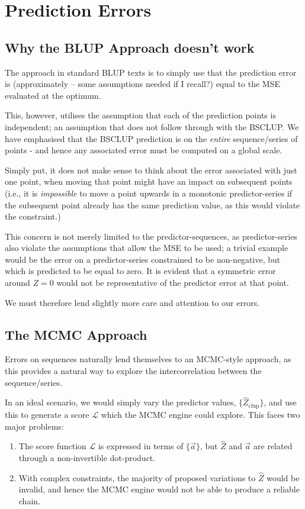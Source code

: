\documentclass[]{article}
\begin{document}
	\section{Prediction Errors}
		
		\subsection{Why the BLUP Approach doesn't work}
			
			The approach in standard BLUP texts is to simply use that the prediction error is (approximately -- some assumptions needed if I recall?) equal to the MSE evaluated at the optimum.

			This, however, utilises the assumption that each of the prediction points is independent; an assumption that does not follow through with the BSCLUP. We have emphasised that the BSCLUP prediction is on the \textit{entire} sequence/series of points - and hence any associated error must be computed on a global scale. 

			Simply put, it does not make sense to think about the error associated with just one point, when moving that point might have an impact on subsequent points (i.e., it is \textit{impossible} to move a point upwards in a monotonic predictor-series if the subsequent point already has the same prediction value, as this would violate the constraint.) 
			
			This concern is not merely limited to the predictor-sequences, as predictor-series also violate the assumptions that allow the MSE to be used; a trivial example would be the error on a predictor-series constrained to be non-negative, but which is predicted to be equal to zero. It is evident that a symmetric error around $Z = 0$ would not be representative of the predictor error at that point.
			
			We must therefore lend slightly more care and attention to our errors.
			
		\subsection{The MCMC Approach}

			Errors on sequences naturally lend themselves to an MCMC-style approach, as this provides a natural way to explore the intercorrelation between the sequence/series.

			In an ideal scenario, we would simply vary the predictor values, $\{\hat{Z}_\text{clup}\}$, and use this to generate a score $\mathcal{L}$ which the MCMC engine could explore. This faces two major problems:
			\begin{enumerate}
				\item The score function $\mathcal{L}$ is expressed in terms of $\{{\vec{a}}\}$, but $\hat{Z}$ and $\vec{a}$ are related through a non-invertible dot-product.
				\item With complex constraints, the majority of proposed variations to $\hat{Z}$ would be invalid, and hence the MCMC engine would not be able to produce a reliable chain.
			\end{enumerate}
\end{document}
